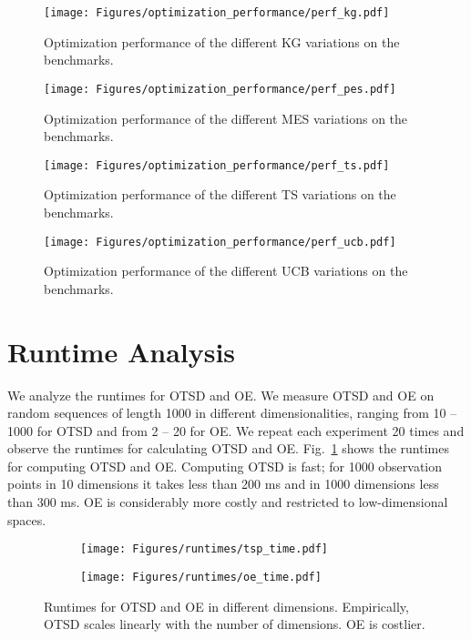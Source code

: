 \documentclass[accepted]{uai2025}
\begin{document}
\begin{figure}[H]
    \centering
    \texttt{[image: Figures/optimization\_performance/perf\_kg.pdf]}
    \caption{Optimization performance of the different KG variations on the benchmarks.}
\end{figure}

\vfill
\newpage
\null
\vfill

\begin{figure}[H]
    \centering
    \texttt{[image: Figures/optimization\_performance/perf\_pes.pdf]}
    \caption{Optimization performance of the different MES variations on the benchmarks.}
\end{figure}

\vfill
\newpage
\null
\vfill

\begin{figure}[H]
    \centering
    \texttt{[image: Figures/optimization\_performance/perf\_ts.pdf]}
    \caption{Optimization performance of the different TS variations on the benchmarks.}
\end{figure}

\vfill
\newpage

\begin{figure}[H]
    \centering
    \texttt{[image: Figures/optimization\_performance/perf\_ucb.pdf]}
    \caption{Optimization performance of the different UCB variations on the benchmarks.}
\end{figure}

\section{Runtime Analysis}
\label{app:runtime}

We analyze the runtimes for \ac{OTSD} and \ac{OE}.
We measure \ac{OTSD} and \ac{OE} on random sequences of length 1000 in different dimensionalities, ranging from 10 -- 1000 for \ac{OTSD} and from 2 -- 20 for \ac{OE}.
We repeat each experiment 20 times and observe the runtimes for calculating \ac{OTSD} and \ac{OE}.
Fig.~\ref{fig:runtimes} shows the runtimes for computing \ac{OTSD} and \ac{OE}. 
Computing \ac{OTSD} is fast; for 1000 observation points in 10 dimensions it takes less than 200 ms and in 1000 dimensions less than 300 ms.
\ac{OE} is considerably more costly and restricted to low-dimensional spaces.

\begin{figure}[H]
    \centering
    \begin{subfigure}{.4\linewidth}
        \texttt{[image: Figures/runtimes/tsp\_time.pdf]}
    \end{subfigure}
    \hfill
    \begin{subfigure}{.4\linewidth}
        \texttt{[image: Figures/runtimes/oe\_time.pdf]}
    \end{subfigure}
    \caption{Runtimes for \ac{OTSD} and \ac{OE} in different dimensions. Empirically, \ac{OTSD} scales linearly with the number of dimensions. \ac{OE} is costlier.}
    \label{fig:runtimes}
\end{figure}
\end{document}
